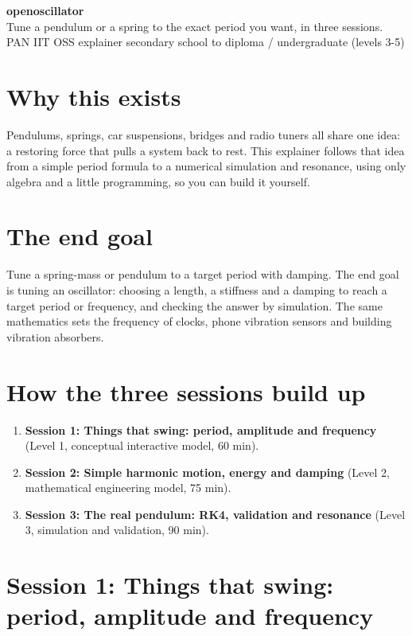 \documentclass[11pt,a4paper]{article}
\begin{document}
\begin{center}{\LARGE\bfseries openoscillator}\\[0.4em]{\large Tune a pendulum or a spring to the exact period you want, in three sessions.}\\[0.2em]\small PAN IIT OSS explainer \textbullet{} secondary school to diploma / undergraduate (levels 3-5)\end{center}

\section*{Why this exists}
Pendulums, springs, car suspensions, bridges and radio tuners all share one idea: a restoring force that pulls a system back to rest. This explainer follows that idea from a simple period formula to a numerical simulation and resonance, using only algebra and a little programming, so you can build it yourself.

\section*{The end goal}
Tune a spring-mass or pendulum to a target period with damping. The end goal is tuning an oscillator: choosing a length, a stiffness and a damping to reach a target period or frequency, and checking the answer by simulation. The same mathematics sets the frequency of clocks, phone vibration sensors and building vibration absorbers.

\section*{How the three sessions build up}
\begin{enumerate}[nosep]
\item \textbf{Session 1: Things that swing: period, amplitude and frequency} (Level 1, conceptual interactive model, 60 min).
\item \textbf{Session 2: Simple harmonic motion, energy and damping} (Level 2, mathematical engineering model, 75 min).
\item \textbf{Session 3: The real pendulum: RK4, validation and resonance} (Level 3, simulation and validation, 90 min).
\end{enumerate}

\section{Session 1: Things that swing: period, amplitude and frequency}
\end{document}

